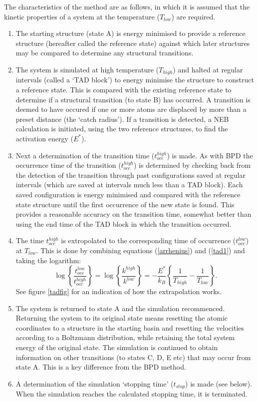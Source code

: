 The characteristics of the method are as follows, in which it is
assumed that the kinetic properties of a system at the temperature
($T_{low}$) are required. 
\begin{enumerate}
\item The starting structure (state A) is energy minimised to provide a
reference structure (hereafter called the reference state) against
which later structures may be compared to determine any structural
transitions.
\item The system is simulated at high temperature ($T_{high}$)
and halted at regular intervals (called a `TAD block') to energy
minimise the structure to construct a reference state. This is
compared with the existing reference state to determine if a
structural transition (to state B) has occurred. A transition is
deemed to have occured if one or more atoms are displaced by more than
a preset distance (the `catch radius'). If a transition is
detected, a NEB calculation is initiated, using the two reference
structures, to find the activation energy ($E^{*}$).
\item Next a determination of the transition time ($t_{occ}^{high}$) is made.
As with BPD the occurrence time of the transition ($t^{high}_{occ}$)
is determined by checking back from the detection of the transition
through past configurations saved at regular intervals (which are
saved at intervals much less than a TAD block).  Each saved
configuration is energy minimised and compared with the reference
state structure until the first occurrence of the new state is
found. This provides a reasonable accuracy on the transition time,
somewhat better than using the end time of the TAD block in which the
transition occurred. 
\item The time $t_{occ}^{high}$ is extropolated to the
corresponding time of occurrence ($t_{occ}^{low}$) at $T_{low}$.  
This is done by combining equations (\ref{arrhenius})
and (\ref{tad1}) and taking the logarithm:
\begin{equation}
\log\left\{\frac{t_{occ}^{low}}{t_{occ}^{high}}\right\}=
\log\left\{\frac{k^{high}}{k^{low}}\right\}=-\frac{E^{*}}{k_B}
\left\{\frac{1}{T_{high}}-\frac{1}{T_{low}}\right\}. \label{tad2}
\end{equation}
See figure \ref{tadfig} for an indication of how the extrapolation
works. 
\item The system is returned to state A and the simulation recommenced. 
Returning the system to its original state means resetting the atomic
coordinates to a structure in the starting basin and resetting the
velocities according to a Boltzmann distribution, while retaining the
total system energy of the original state.  The simulation is
continued to obtain information on other transitions (to states C, D,
E etc) that may occur from state A. This is a key difference from the
BPD method.
\item A determination of the simulation `stopping time' ($t_{stop}$)
is made (see below). When the simulation reaches the calculated
stopping time, it is terminated.
\end{enumerate}


